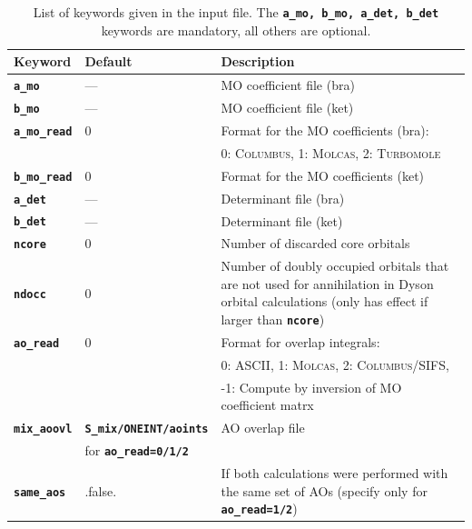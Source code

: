 \documentclass[a4paper,10pt,DIV=15,openany,twoside=false]{scrbook}
\newcommand{\ttt}[1]{\textbf{\texttt{#1}}}
\begin{document}
\begin{table}[tb]
  \caption{List of keywords given in the input file. The \ttt{a\_mo, b\_mo, a\_det, b\_det} keywords are mandatory, all others are optional.}
  \label{tab:key_wfo}
  \begin{tabular}{llp{9cm}}
    \hline
    Keyword & Default & Description \\
    \hline
    \ttt{a\_mo}                 & ---                           & MO coefficient file (bra)\\
    \ttt{b\_mo}                 & ---                           & MO coefficient file (ket)\\
    \ttt{a\_mo\_read}           & 0                             & Format for the MO coefficients (bra):\\
                                                                && 0: \textsc{Columbus}, 1: \textsc{Molcas}, 2: \textsc{Turbomole}\\
    \ttt{b\_mo\_read}           & 0                             & Format for the MO coefficients (ket)\\
    \ttt{a\_det}                & ---                           & Determinant file (bra)\\
    \ttt{b\_det}                & ---                           & Determinant file (ket)\\
    \ttt{ncore}                 & 0                             & Number of discarded core orbitals\\
    \ttt{ndocc}                 & 0                             & Number of doubly occupied orbitals that are not used for 
                                                                annihilation in Dyson orbital calculations (only has effect if larger than \ttt{ncore})\\
    \ttt{ao\_read}              & 0                             & Format for overlap integrals:\\
                                                                &&0: ASCII, 1: \textsc{Molcas}, 2: \textsc{Columbus/SIFS},\\
                                                                &&-1: Compute by inversion of MO coefficient matrx\\
    \ttt{mix\_aoovl}            & \ttt{S\_mix/ONEINT/aoints}    & AO overlap file\\
                                & for \ttt{ao\_read=0/1/2}      &\\
    \ttt{same\_aos}             & .false.                       & If both calculations were performed with the same set of AOs (specify only for \ttt{ao\_read=1/2})\\

\end{tabular}
\end{table}
\end{document}
